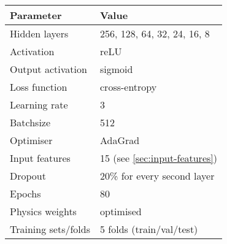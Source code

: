 

\begin{tabular}{l l}
    \toprule
    Parameter & Value \\
    \midrule
    Hidden layers & 256, 128, 64, 32, 24, 16, 8 \\
    Activation & reLU \\ 
    Output activation & sigmoid \\ 
    Loss function & cross-entropy \\ 
    Learning rate & 3 \\
    Batchsize & 512 \\ 
    Optimiser & AdaGrad \\
    Input features & 15 (see \cref{sec:input-features}) \\
    Dropout &  20\% for every second layer \\ 
    Epochs & 80 \\
    Physics weights & optimised \\ 
    Training sets/folds & 5 folds (train/val/test) \\
    \bottomrule
\end{tabular}
